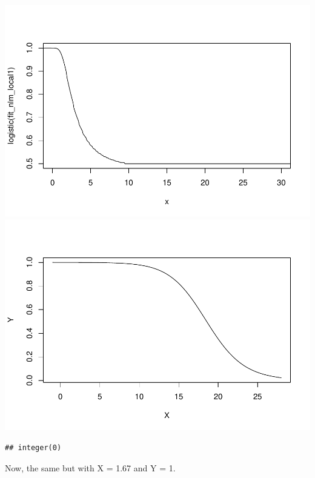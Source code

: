 \documentclass[
]{article}
\begin{document}
\includegraphics{prueba_files/figure-latex/unnamed-chunk-7-1.pdf}
\includegraphics{prueba_files/figure-latex/unnamed-chunk-7-2.pdf}

\begin{verbatim}
## integer(0)
\end{verbatim}

Now, the same but with X = 1.67 and Y = 1.
\end{document}
